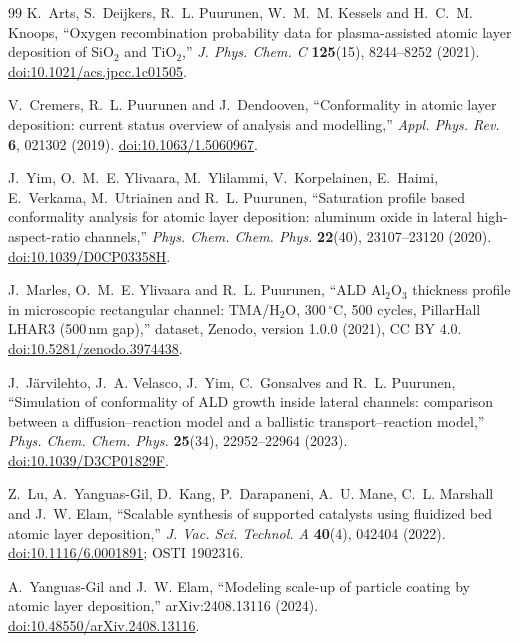 \documentclass[11pt,letterpaper]{article}
\newcommand{\degC}{$^{\circ}$C}
\begin{document}
\begin{thebibliography}{99}
K.~Arts, S.~Deijkers, R.~L. Puurunen, W.~M.~M. Kessels and H.~C.~M. Knoops,
``Oxygen recombination probability data for plasma-assisted atomic layer deposition of SiO$_2$ and TiO$_2$,''
\emph{J. Phys. Chem. C} \textbf{125}(15), 8244--8252 (2021).
\href{https://doi.org/10.1021/acs.jpcc.1c01505}{doi:10.1021/acs.jpcc.1c01505}.

V.~Cremers, R.~L. Puurunen and J.~Dendooven,
``Conformality in atomic layer deposition: current status overview of analysis and modelling,''
\emph{Appl. Phys. Rev.} \textbf{6}, 021302 (2019).
\href{https://doi.org/10.1063/1.5060967}{doi:10.1063/1.5060967}.

J.~Yim, O.~M.~E. Ylivaara, M.~Ylilammi, V.~Korpelainen, E.~Haimi, E.~Verkama, M.~Utriainen and R.~L. Puurunen,
``Saturation profile based conformality analysis for atomic layer deposition: aluminum oxide in lateral high-aspect-ratio channels,''
\emph{Phys. Chem. Chem. Phys.} \textbf{22}(40), 23107--23120 (2020).
\href{https://doi.org/10.1039/D0CP03358H}{doi:10.1039/D0CP03358H}.

J.~Marles, O.~M.~E. Ylivaara and R.~L. Puurunen,
``ALD Al$_2$O$_3$ thickness profile in microscopic rectangular channel: TMA/H$_2$O, 300\,\degC, 500 cycles, PillarHall LHAR3 (500\,nm gap),'' dataset, Zenodo, version 1.0.0 (2021), CC BY 4.0.
\href{https://doi.org/10.5281/zenodo.3974438}{doi:10.5281/zenodo.3974438}.

J.~J\"arvilehto, J.~A. Velasco, J.~Yim, C.~Gonsalves and R.~L. Puurunen,
``Simulation of conformality of ALD growth inside lateral channels: comparison between a diffusion--reaction model and a ballistic transport--reaction model,''
\emph{Phys. Chem. Chem. Phys.} \textbf{25}(34), 22952--22964 (2023).
\href{https://doi.org/10.1039/D3CP01829F}{doi:10.1039/D3CP01829F}.

Z.~Lu, A.~Yanguas-Gil, D.~Kang, P.~Darapaneni, A.~U. Mane, C.~L. Marshall and J.~W. Elam,
``Scalable synthesis of supported catalysts using fluidized bed atomic layer deposition,''
\emph{J. Vac. Sci. Technol. A} \textbf{40}(4), 042404 (2022).
\href{https://doi.org/10.1116/6.0001891}{doi:10.1116/6.0001891}; OSTI 1902316.

A.~Yanguas-Gil and J.~W. Elam,
``Modeling scale-up of particle coating by atomic layer deposition,''
arXiv:2408.13116 (2024).
\href{https://doi.org/10.48550/arXiv.2408.13116}{doi:10.48550/arXiv.2408.13116}.


\end{thebibliography}
\end{document}
